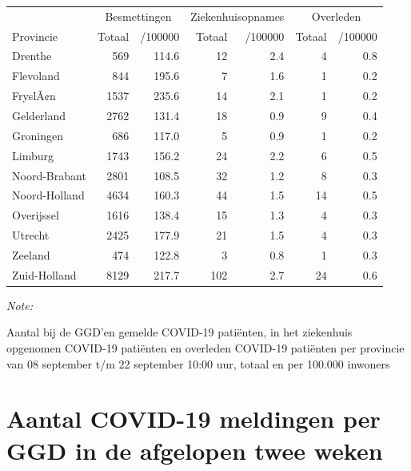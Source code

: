 \documentclass[
  english,
  man,floatsintext]{apa6}
\begin{document}
\begin{table}
\centering
\begin{threeparttable}
\begin{tabular}{lrrrrrr}
\toprule
\multicolumn{1}{c}{ } & \multicolumn{2}{c}{Besmettingen} & \multicolumn{2}{c}{Ziekenhuisopnames} & \multicolumn{2}{c}{Overleden} \\
\cmidrule(l{3pt}r{3pt}){2-3} \cmidrule(l{3pt}r{3pt}){4-5} \cmidrule(l{3pt}r{3pt}){6-7}
Provincie & Totaal & /100000 & Totaal & /100000 & Totaal & /100000\\
\midrule
Drenthe & 569 & 114.6 & 12 & 2.4 & 4 & 0.8\\
Flevoland & 844 & 195.6 & 7 & 1.6 & 1 & 0.2\\
FryslÃ¢n & 1537 & 235.6 & 14 & 2.1 & 1 & 0.2\\
Gelderland & 2762 & 131.4 & 18 & 0.9 & 9 & 0.4\\
Groningen & 686 & 117.0 & 5 & 0.9 & 1 & 0.2\\
Limburg & 1743 & 156.2 & 24 & 2.2 & 6 & 0.5\\
Noord-Brabant & 2801 & 108.5 & 32 & 1.2 & 8 & 0.3\\
Noord-Holland & 4634 & 160.3 & 44 & 1.5 & 14 & 0.5\\
Overijssel & 1616 & 138.4 & 15 & 1.3 & 4 & 0.3\\
Utrecht & 2425 & 177.9 & 21 & 1.5 & 4 & 0.3\\
Zeeland & 474 & 122.8 & 3 & 0.8 & 1 & 0.3\\
Zuid-Holland & 8129 & 217.7 & 102 & 2.7 & 24 & 0.6\\
\bottomrule
\end{tabular}
\begin{tablenotes}
\item \textit{Note: } 
\item Aantal bij de GGD’en gemelde COVID-19 patiënten, in het ziekenhuis opgenomen COVID-19 patiënten en overleden COVID-19 patiënten per provincie van 08 september t/m 22 september 10:00 uur, totaal en per 100.000 inwoners
\end{tablenotes}
\end{threeparttable}
\end{table}

\newpage

\hypertarget{aantal-covid-19-meldingen-per-ggd-in-de-afgelopen-twee-weken}{%
\section{Aantal COVID-19 meldingen per GGD in de afgelopen twee weken}\label{aantal-covid-19-meldingen-per-ggd-in-de-afgelopen-twee-weken}}
\end{document}
